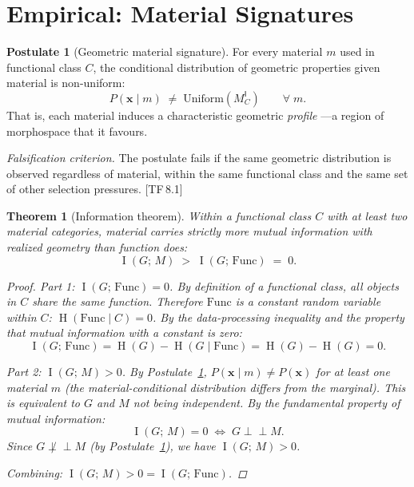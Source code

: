 \documentclass[10pt]{article}
\theoremstyle{definition}
\newtheorem{postulate}[definition]{Postulate}
\theoremstyle{plain}
\newtheorem{theorem}[definition]{Theorem}
\theoremstyle{remark}
\newcommand{\MC}{M^{\mathsf{I}}_C}          %
\DeclareMathOperator{\MI}{I}                 %
\DeclareMathOperator{\Ent}{H}                %
\newcommand{\TF}[1]{\textnormal{[TF\,#1]}}  %
\begin{document}
\newpage
\section{Empirical: Material Signatures}\label{sec:empirical}

\begin{postulate}[Geometric material signature]\label{post:5.1}
For every material $m$ used in functional class $C$, the conditional
distribution of geometric properties given material is non-uniform:
\[
  P(\bm{x} \mid m) \;\neq\; \mathrm{Uniform}(\MC)
  \qquad \forall\; m.
\]
That is, each material induces a characteristic geometric \emph{profile}
---a region of morphospace that it favours.

\medskip\noindent
\textit{Falsification criterion.}
The postulate fails if the same geometric distribution is observed
regardless of material, within the same functional class and the same
set of other selection pressures. \TF{8.1}
\end{postulate}

\begin{theorem}[Information theorem]\label{thm:5.2}
Within a functional class $C$ with at least two material categories,
material carries strictly more mutual information with realized geometry
than function does:
\[
  \MI(G;\, M) \;>\; \MI(G;\, \mathrm{Func}) \;=\; 0.
\]

\begin{proof}
\textit{Part 1: $\MI(G;\, \mathrm{Func}) = 0$.}\;
By definition of a functional class, all objects in $C$ share the same
function. Therefore $\mathrm{Func}$ is a constant random variable within
$C$: $\Ent(\mathrm{Func} \mid C) = 0$. By the data-processing
inequality and the property that mutual information with a constant is
zero:
\[
  \MI(G;\, \mathrm{Func}) = \Ent(G) - \Ent(G \mid \mathrm{Func})
  = \Ent(G) - \Ent(G) = 0.
\]

\textit{Part 2: $\MI(G;\, M) > 0$.}\;
By Postulate~\ref{post:5.1}, $P(\bm{x} \mid m) \neq P(\bm{x})$ for
at least one material $m$ (the material-conditional distribution differs
from the marginal). This is equivalent to $G$ and $M$ not being
independent. By the fundamental property of mutual information:
\[
  \MI(G;\, M) = 0 \;\iff\; G \perp\!\!\!\perp M.
\]
Since $G \not\perp\!\!\!\perp M$ (by Postulate~\ref{post:5.1}), we
have $\MI(G;\, M) > 0$.

\textit{Combining:}\; $\MI(G;\, M) > 0 = \MI(G;\, \mathrm{Func})$.
\qedhere
\end{proof}
\end{theorem}
\end{document}
